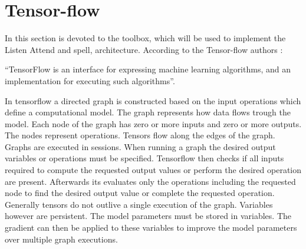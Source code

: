 \section{Tensor-flow}
In this section is devoted to the toolbox, which will be used to implement the Listen Attend and spell, architecture. According to the Tensor-flow authors \cite{Agarwal2015}:

\enquote{TensorFlow is an interface for expressing machine learning algorithms, and an implementation for executing such algorithms}.

In tensorflow a directed graph is constructed based on the input operations which define a computational model. The graph represents how data flows trough the model. Each node of the graph has zero or more inputs and zero or more outputs. The nodes represent operations. Tensors flow along the edges of the graph.
Graphs are executed in sessions. When running a graph the desired output variables or operations must be specified. Tensorflow then checks if all inputs required to compute the requested output values or perform the desired operation are present. Afterwards its evaluates only the operations including the requested node to find the desired output value or complete the requested operation.
Generally tensors do not outlive a single execution of the graph. Variables however are persistent. The model parameters must be stored in variables. The gradient can then be applied to these variables to improve the model parameters over multiple graph executions.